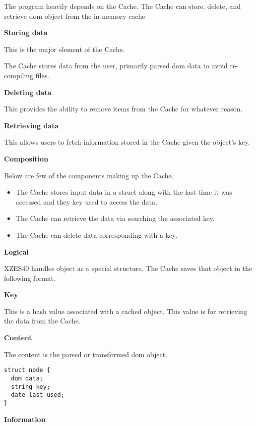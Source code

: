 The program heavily depends on the Cache.
The Cache can store, delete, and retrieve \gls{dom} object from the in-memory cache 

\textbf{Storing data}

This is the major element of the Cache.

The Cache stores data from the user, primarily parsed \gls{dom} data to avoid re-compiling files.

\textbf{Deleting data}

This provides the ability to remove items from the Cache for whatever reason.

\textbf{Retrieving data}

This allows users to fetch information stored in the Cache given the object's key.

\textbf{Composition}

Below are few of the components making up the Cache.

\begin{itemize}
    \item The Cache stores input data in a \gls{struct} along with the last time it was accessed and they key used to access the data.
    \item The Cache can retrieve the data via searching the associated key.
    \item The Cache can delete data corresponding with a key.
\end{itemize}

\textbf{Logical}

XZES40 handles object as a special structure.
The Cache saves that object in the following format.

\textbf{Key}

This is a hash value associated with a cached object.
This value is for retrieving the data from the Cache.

\textbf{Content}

The content is the parsed or transformed \gls{dom} object.

\begin{lstlisting}[caption={Psuedocode for the caching generic object ``node''.}]
struct node {
  dom data;
  string key;
  date last_used;
}
\end{lstlisting}

\textbf{Information}

